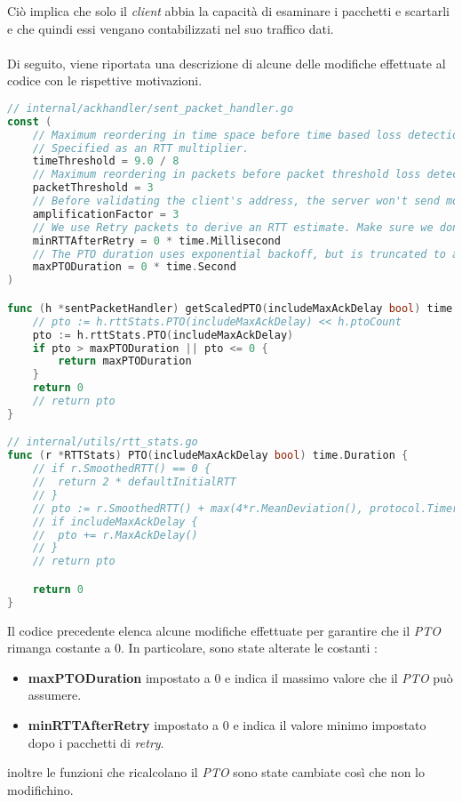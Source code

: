 Ciò implica che solo il \emph{client} abbia la capacità di esaminare i pacchetti e scartarli e che quindi essi vengano contabilizzati nel suo traffico dati.
\\\\
Di seguito, viene riportata una descrizione di alcune delle modifiche effettuate al codice con le rispettive motivazioni.
\begin{lstlisting}[language=Go]
// internal/ackhandler/sent_packet_handler.go
const (
	// Maximum reordering in time space before time based loss detection considers a packet lost.
	// Specified as an RTT multiplier.
	timeThreshold = 9.0 / 8
	// Maximum reordering in packets before packet threshold loss detection considers a packet lost.
	packetThreshold = 3
	// Before validating the client's address, the server won't send more than 3x bytes than it received.
	amplificationFactor = 3
	// We use Retry packets to derive an RTT estimate. Make sure we don't set the RTT to a super low value yet.
	minRTTAfterRetry = 0 * time.Millisecond 
	// The PTO duration uses exponential backoff, but is truncated to a maximum value, as allowed by RFC 8961, section 4.4.
	maxPTODuration = 0 * time.Second 
)

func (h *sentPacketHandler) getScaledPTO(includeMaxAckDelay bool) time.Duration {
	// pto := h.rttStats.PTO(includeMaxAckDelay) << h.ptoCount
	pto := h.rttStats.PTO(includeMaxAckDelay)
	if pto > maxPTODuration || pto <= 0 {
		return maxPTODuration
	}
	return 0
	// return pto
}

// internal/utils/rtt_stats.go
func (r *RTTStats) PTO(includeMaxAckDelay bool) time.Duration {
	// if r.SmoothedRTT() == 0 {
	// 	return 2 * defaultInitialRTT
	// }
	// pto := r.SmoothedRTT() + max(4*r.MeanDeviation(), protocol.TimerGranularity)
	// if includeMaxAckDelay {
	// 	pto += r.MaxAckDelay()
	// }
	// return pto

	return 0
}
\end{lstlisting}
\noindent Il codice precedente elenca alcune modifiche effettuate per garantire che il \emph{PTO} rimanga costante a 0. 
In particolare, sono state alterate le costanti : 
\begin{itemize}
    \item \textbf{maxPTODuration} impostato a 0 e indica il massimo valore che il \emph{PTO} può assumere. 
    \item \textbf{minRTTAfterRetry} impostato a 0 e indica il valore minimo impostato dopo i pacchetti di \emph{retry}.
\end{itemize}
\noindent inoltre le funzioni che ricalcolano il \emph{PTO} sono state cambiate così che non lo modifichino.
